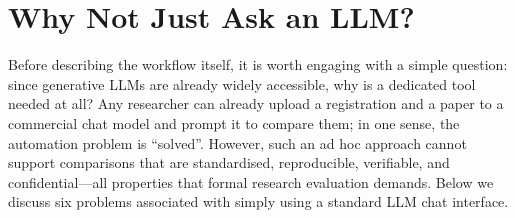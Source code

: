 \documentclass{article}
\begin{document}
\section{Why Not Just Ask an LLM?}\label{sec:why-not-llm}

Before describing the workflow itself, it is worth engaging with a simple
question: since generative LLMs are already widely accessible, why is a
dedicated tool needed at all? Any researcher can already upload a registration
and a paper to a commercial chat model and prompt it to compare them; in one
sense, the automation problem is ``solved''. However, such an ad hoc approach
cannot support comparisons that are standardised, reproducible, verifiable, and
confidential---all properties that formal research evaluation demands. Below we
discuss six problems associated with simply using a standard LLM chat interface.
\end{document}
